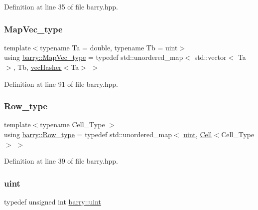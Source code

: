Definition at line 35 of file barry.\+hpp.

\mbox{\label{namespacebarry_a2f0d3aab1d67e4c8eaeab9022e16139f}} 
\subsubsection{\texorpdfstring{Map\+Vec\+\_\+type}{MapVec\_type}}
{\footnotesize\ttfamily template$<$typename Ta  = double, typename Tb  = uint$>$ \\
using \hyperlink{namespacebarry_a2f0d3aab1d67e4c8eaeab9022e16139f}{barry\+::\+Map\+Vec\+\_\+type} = typedef std\+::unordered\+\_\+map$<$ std\+::vector$<$ Ta $>$, Tb, \hyperlink{structbarry_1_1vec_hasher}{vec\+Hasher}$<$Ta$>$ $>$}



Definition at line 91 of file barry.\+hpp.

\mbox{\label{namespacebarry_a8f67f2e1e26f3cb10d240b7e1a1d917c}} 
\subsubsection{\texorpdfstring{Row\+\_\+type}{Row\_type}}
{\footnotesize\ttfamily template$<$typename Cell\+\_\+\+Type $>$ \\
using \hyperlink{namespacebarry_a8f67f2e1e26f3cb10d240b7e1a1d917c}{barry\+::\+Row\+\_\+type} = typedef std\+::unordered\+\_\+map$<$ \hyperlink{namespacebarry_a11dfc53ddb4672278319aa04f1e09a6c}{uint}, \hyperlink{classbarry_1_1_cell}{Cell}$<$Cell\+\_\+\+Type$>$ $>$}



Definition at line 39 of file barry.\+hpp.

\mbox{\label{namespacebarry_a11dfc53ddb4672278319aa04f1e09a6c}} 
\subsubsection{\texorpdfstring{uint}{uint}}
{\footnotesize\ttfamily typedef unsigned int \hyperlink{namespacebarry_a11dfc53ddb4672278319aa04f1e09a6c}{barry\+::uint}}



